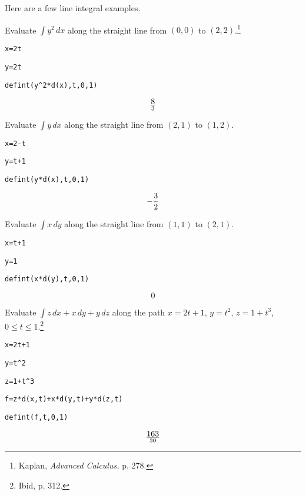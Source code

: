 \newpage

\noindent
Here are a few line integral examples.

\medskip
\noindent
Evaluate $\int y^2\,dx$ along the straight
line from $(0,0)$ to $(2,2)$.\footnote{Kaplan,
{\it Advanced Calculus,} p. 278.}

\medskip
\verb$x=2t$

\verb$y=2t$

\verb$defint(y^2*d(x),t,0,1)$

$$8\over3$$

\medskip
\noindent
Evaluate $\int y\,dx$ along the straight line from
$(2,1)$ to $(1,2)$.

\medskip
\verb$x=2-t$

\verb$y=t+1$

\verb$defint(y*d(x),t,0,1)$

$$-{3\over2}$$

\medskip
\noindent
Evaluate $\int x\,dy$ along the straight line from
$(1,1)$ to $(2,1)$.

\medskip
\verb$x=t+1$

\verb$y=1$

\verb$defint(x*d(y),t,0,1)$

$$0$$

\medskip
\noindent
Evaluate $\int z\,dx+x\,dy+y\,dz$
along the path
$x=2t+1$, $y=t^2$, $z=1+t^3$, $0\le t\le 1$.\footnote{Ibid, p. 312.}

\medskip
\verb$x=2t+1$

\verb$y=t^2$

\verb$z=1+t^3$

\verb$f=z*d(x,t)+x*d(y,t)+y*d(z,t)$

\verb$defint(f,t,0,1)$

$$163\over30$$

